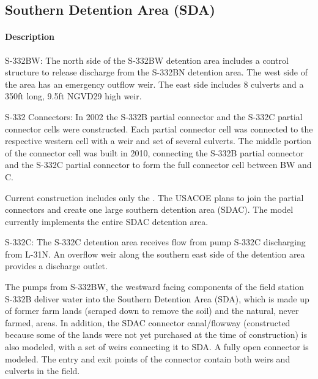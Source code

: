 \clearpage
\subsection{Southern Detention Area (SDA)}

\paragraph{Description}

S-332BW: The north side of the S-332BW detention area includes a control structure to release discharge from the S-332BN detention area. The west side of the area has an emergency outflow weir. The east side includes 8 culverts and a 350ft long, 9.5ft NGVD29 high weir.

S-332 Connectors: In 2002 the S-332B partial connector and the S-332C partial connector cells were constructed. Each partial connector cell was connected to the respective western cell with a weir and set of several culverts. The middle portion of the connector cell was built in 2010, connecting the S-332B partial connector and the S-332C partial connector to form the full connector cell between BW and C.

Current construction includes only the . The USACOE plans to join the partial connectors and create one large southern detention area (SDAC). The model currently implements the entire SDAC detention area.



S-332C: The S-332C detention area receives flow from pump S-332C discharging from L-31N. An overflow weir along the southern east side of the detention area provides a discharge outlet.

The pumps from S-332BW, the westward facing components of the field station S-332B deliver water into the Southern Detention Area (SDA), which is made up of former farm lands (scraped down to remove the soil) and the natural, never farmed, areas.
In addition, the SDAC connector canal/flowway (constructed because some of the lands were not yet purchased at the time of construction) is also modeled, with a set of weirs connecting it to SDA. A fully open connector is modeled.
The entry and exit points of the connector contain both weirs and culverts in the field.

